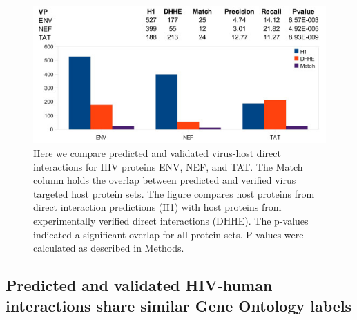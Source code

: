 \begin{figure}
\begin{center}
\includegraphics[scale=.75]{figs/medGen_direct}
\end{center}
\caption[Evaluation of direct HIV-human interaction
  predictions]{\small Here we compare predicted and validated
  virus-host direct interactions for HIV proteins ENV, NEF, and
  TAT. The Match column holds the overlap between predicted and
  verified virus targeted host protein sets. The figure compares host
  proteins from direct interaction predictions (H1) with host proteins
  from experimentally verified direct interactions (DHHE). The
  p-values indicated a significant overlap for all protein
  sets. P-values were calculated as described in
  Methods. \label{fig:medGen:direct_eval}}
\end{figure}


\subsection{Predicted and validated HIV-human interactions share similar Gene Ontology labels}



